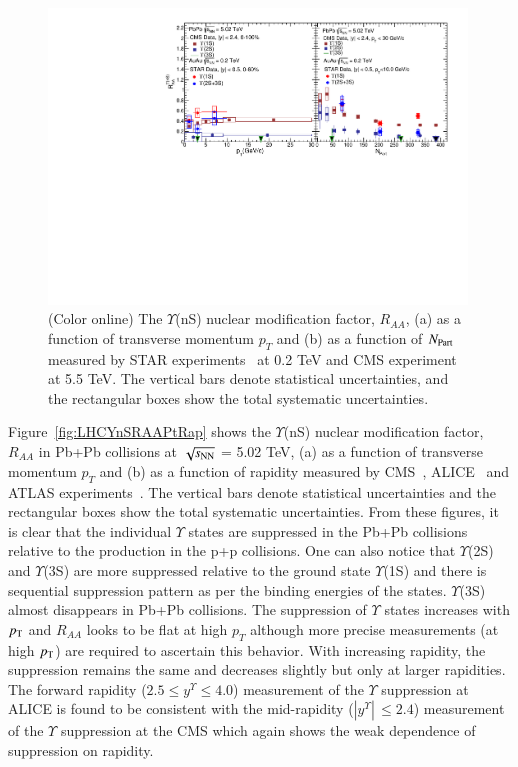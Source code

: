 \begin{figure}
  \includegraphics[width=0.99\textwidth]{Figures/Fig8_RHIC_LHC_YnSRAA.pdf}
  \caption{(Color online) The $\Upsilon$(nS) nuclear modification factor, $R_{AA}$, (a) as a function of transverse momentum $p_{T}$
    and (b) as a function of $N_{\rm Part}$ measured by STAR experiments~\cite{Wang:2019vau} at 0.2 TeV and CMS experiment~\cite{CMS:2018zza} at 5.5 TeV.
    The vertical bars denote statistical uncertainties, and the rectangular boxes show the total systematic uncertainties.
  }
  \label{fig:RHICYnSRAANPart}
\end{figure}


Figure~\ref{fig:LHCYnSRAAPtRap} shows the $\Upsilon$(nS) nuclear modification factor, $R_{AA}$
in Pb+Pb collisions at $\sqrt{s_{\rm NN}}$ = 5.02 TeV, (a) as a function of transverse momentum $p_{T}$
and (b) as a function of rapidity measured by CMS~\cite{CMS:2018zza}, ALICE~\cite{ALICE:2020wwx}
and ATLAS experiments~\cite{ALICE:2020wwx}.
The vertical bars denote statistical uncertainties and the rectangular boxes
show the total systematic uncertainties. From these figures, it is clear 
that the individual $\Upsilon$ states are suppressed in
the Pb+Pb collisions relative to the production in the p+p collisions.
One can also notice that $\Upsilon$(2S) and $\Upsilon$(3S) are 
more suppressed relative to the ground state $\Upsilon$(1S) and there is sequential
suppression pattern as per the binding energies of the states.
$\Upsilon$(3S) almost disappears in Pb+Pb collisions. 
The suppression of $\Upsilon$ states increases with $p_{\rm T}$ and $R_{AA}$ looks
to be flat at high $p_T$ although more precise measurements (at high $p_{\rm T}$) are required to ascertain
this behavior. 
With increasing rapidity, the suppression remains the same and decreases
slightly but only at larger rapidities.
The forward rapidity ($2.5 \leq y^{\Upsilon} \leq 4.0$) measurement of the $\Upsilon$ suppression at 
ALICE is found to be consistent with the mid-rapidity ($|y^{\Upsilon}|\,\leq 2.4$)
measurement of the $\Upsilon$ suppression at the CMS which again shows the weak dependence
of suppression on rapidity.


